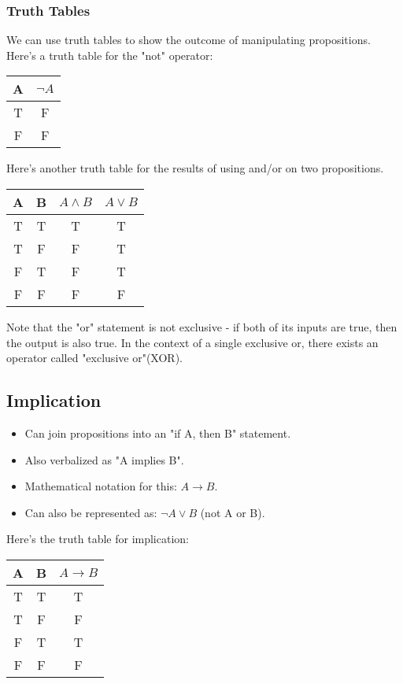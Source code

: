\subsubsection{Truth Tables}
We can use truth tables to show the outcome of manipulating propositions. Here's a truth table for the "not" operator:

\vspace{1em}
\begin{tabular}{c|c}
    A & $\neg A$ \\
    \hline
    T & F \\ 
    F & F \\
\end{tabular}
\vspace{1em}

Here's another truth table for the results of using and/or on two propositions.

\vspace{1em}
\begin{tabular}{c|c|c|c}
    A & B & $A \land B$ & $A \lor B$ \\
    \hline
    T & T & T & T \\
    T & F & F & T \\
    F & T & F & T \\
    F & F & F & F
\end{tabular}
\vspace{1em}

Note that the "or" statement is not exclusive - if both of its inputs are true, then the output is also true. In the context of a single exclusive or, there exists an operator called "exclusive or"(XOR).

\subsection{Implication}
\begin{itemize}
    \item Can join propositions into an "if A, then B" statement.
    \item Also verbalized as "A implies B".
    \item Mathematical notation for this: $A \rightarrow B$.
    \item Can also be represented as: $\neg A \lor B$ (not A or B).
\end{itemize}

Here's the truth table for implication:

\vspace{1em}
\begin{tabular}{c|c|c}
    A & B & $A \rightarrow B$\\
    \hline
    T & T & T \\
    T & F & F \\
    F & T & T \\
    F & F & F \\
\end{tabular}
\vspace{1em}


